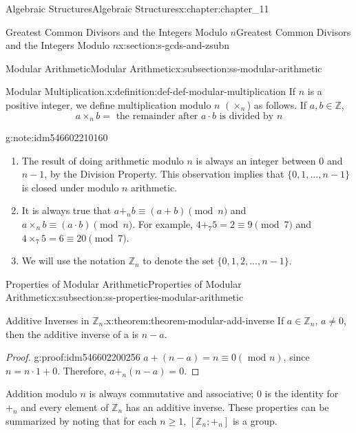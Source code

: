 \documentclass[oneside,10pt,]{book}
\numberwithin{equation}{section}
\begin{document}
\begin{chapterptx}{Algebraic Structures}{}{Algebraic Structures}{}{}{x:chapter:chapter_11}
\begin{sectionptx}{Greatest Common Divisors  and the Integers Modulo \(n\)}{}{Greatest Common Divisors  and the Integers Modulo \(n\)}{}{}{x:section:s-gcds-and-zsubn}
\begin{subsectionptx}{Modular Arithmetic}{}{Modular Arithmetic}{}{}{x:subsection:ss-modular-arithmetic}
\begin{definition}{Modular Multiplication.}{x:definition:def-def-modular-multiplication}
%
\label{g:notation:idm546602214368}%
If \(n\) is a positive integer, we define  multiplication modulo \(n\) \(\left(\times_n\right.\)) as follows. If \(a, b \in  \mathbb{Z}\),%
\begin{equation*}
a \times_n b = \textrm{ the remainder after } a \cdot b \textrm{ is divided by } n
\end{equation*}
%
\end{definition}
\begin{note}{}{g:note:idm546602210160}%
%
\begin{enumerate}[label=(\alph*)]
\item{}The result of doing arithmetic modulo \(n\) is always an integer between 0 and \(n-1\), by the Division Property. This observation implies that \(\{0, 1,\dots, n-1\}\) is closed under modulo \(n\) arithmetic.%
\item{}It is always true that \(a +_n b \equiv  (a + b) \pmod{n}\) and \(a\times_n b \equiv  (a \cdot  b) \pmod{n}\).   For example, \(4 +_7 5 = 2 \equiv  9 \pmod{7}\) and \(4 \times_7  5 =  6 \equiv  20 \pmod{7}\).%
\item{}We will use the notation \(\mathbb{Z}_n\) to denote the set \(\{0, 1, 2,. . ., n-1\}\).%
\end{enumerate}
%
\end{note}
\end{subsectionptx}
%
%
\typeout{************************************************}
\typeout{************************************************}
%
\begin{subsectionptx}{Properties of Modular Arithmetic}{}{Properties of Modular Arithmetic}{}{}{x:subsection:ss-properties-modular-arithmetic}
%
\begin{theorem}{Additive Inverses in \(\mathbb{Z}_n\).}{}{x:theorem:theorem-modular-add-inverse}%
If \(a \in  \mathbb{Z}_n\), \(a\neq 0\), then the additive inverse of a is \(n - a\).%
\end{theorem}
\begin{proof}{}{g:proof:idm546602200256}
\(a + (n - a) =n\equiv 0(\textrm{ mod } n)\), since  \(n = n\cdot 1 + 0\).  Therefore,  \(a+_n(n-a)=0\).%
\end{proof}
Addition modulo \(n\) is always commutative and associative; 0 is the identity for \(+_n\) and every element of \(\mathbb{Z}_n\) has an additive inverse.  These properties can be summarized by noting that for each \(n\geq 1\), \(\left[\mathbb{Z}_n; +_n\right]\) is a group.%

\end{subsectionptx}
\end{sectionptx}
\end{chapterptx}
\end{document}
